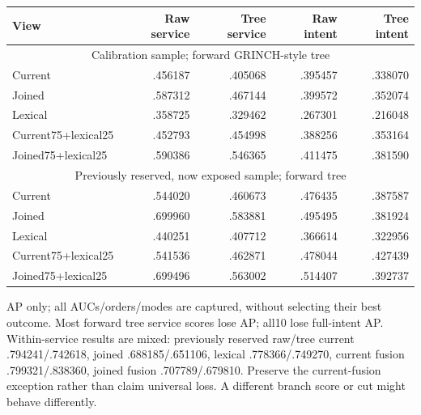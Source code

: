 \documentclass[11pt]{article}
\begin{document}
\begin{center}
\small
\begin{tabular}{lrrrr}
\toprule
View & Raw service & Tree service & Raw intent & Tree intent \\
\midrule
\multicolumn{5}{c}{Calibration sample; forward GRINCH-style tree} \\
Current & .456187 & .405068 & .395457 & .338070 \\
Joined & .587312 & .467144 & .399572 & .352074 \\
Lexical & .358725 & .329462 & .267301 & .216048 \\
Current75+lexical25 & .452793 & .454998 & .388256 & .353164 \\
Joined75+lexical25 & .590386 & .546365 & .411475 & .381590 \\
\midrule
\multicolumn{5}{c}{Previously reserved, now exposed sample; forward tree} \\
Current & .544020 & .460673 & .476435 & .387587 \\
Joined & .699960 & .583881 & .495495 & .381924 \\
Lexical & .440251 & .407712 & .366614 & .322956 \\
Current75+lexical25 & .541536 & .462871 & .478044 & .427439 \\
Joined75+lexical25 & .699496 & .563002 & .514407 & .392737 \\
\bottomrule
\end{tabular}
\end{center}
AP only; all AUCs/orders/modes are captured, without selecting their best outcome.
Most forward tree service scores lose AP; all10 lose full-intent AP. Within-service
results are mixed: previously reserved raw/tree current .794241/.742618,
joined .688185/.651106, lexical .778366/.749270, current fusion .799321/.838360,
joined fusion .707789/.679810. Preserve the current-fusion exception rather than
claim universal loss. A different branch score or cut might behave differently.
\end{document}

